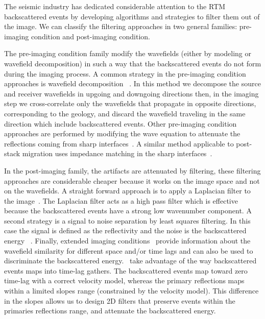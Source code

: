 The seismic industry has dedicated considerable attention to the RTM backscattered events by 
developing algorithms and strategies to filter them out of the image. We can classify the filtering
 approaches in two general families: pre-imaging condition and post-imaging condition. 


The pre-imaging condition family modify the wavefields (either by modeling or wavefield decomposition)
 in such a way that the backscattered events do not form during the imaging process.
A common strategy in the pre-imaging condition approaches is wavefield decomposition
~\citep[]{liu:S29,fei:3130}. In this method we decompose the source and receiver wavefields in upgoing
and downgoing directions then, in the imaging step we cross-correlate only the wavefields that propagate
in opposite directions, corresponding to the geology, and discard the wavefield traveling in the same direction
which include backscattered events. Other pre-imaging 
condition approaches are performed by modifying  the wave equation to attenuate the reflections coming from 
sharp interfaces~\citep{fletcher:2049}. A similar method applicable to post-stack migration 
uses impedance matching in the sharp interfaces~\citep{baysal:132}. 

In the post-imaging family, the artifacts are attenuated by filtering, these filtering approaches
 are considerable cheaper because it works on the image space and not on the wavefields. A straight forward
 approach is to apply a Laplacian filter to the image~\citep{youn:246}. The Laplacian
 filter acts as a high pass filter which is effective because the backscattered events have a strong low wavenumber
component. A second strategy is a signal to noise separation by least squares filtering. In
 this case the signal is defined as the reflectivity and the noise is the backscattered energy
~\citep{guitton:S19}. Finally, extended imaging conditions~\citep{sava:S209} provide information
 about the wavefield similarity for different space and/or time lags and can also be used to discriminate
the backscattered energy.~\cite{kaelin:3125} take advantage of the way backscattered events maps into 
time-lag gathers. The backscattered events map toward zero time-lag with a correct velocity model, whereas the primary 
reflections maps within a limited slopes range (constrained by the velocity model). This difference in
 the slopes allows us to design 2D filters that preserve events within the primaries reflections range, and
attenuate the backscattered energy.


